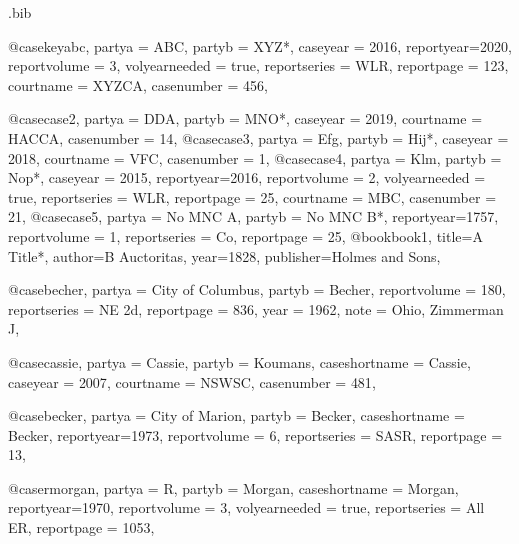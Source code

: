 

\begin{filecontents*}{\jobname.bib}

@case{keyabc,
  partya = {ABC}, 
  partyb = {XYZ*},
  caseyear = {2016},
  reportyear={2020},
  reportvolume = {3},
  volyearneeded = {true},
  reportseries = {WLR},
  reportpage = {123},
  courtname = {XYZCA},
  casenumber = {456},
	}

@case{case2,
  partya = {DDA}, 
  partyb = {MNO*},
  caseyear = {2019},
  courtname = {HACCA},
  casenumber = {14},
	}
@case{case3,
  partya = {Efg}, 
  partyb = {Hij*},
  caseyear = {2018},
  courtname = {VFC},
  casenumber = {1},
	}
@case{case4,
  partya = {Klm}, 
  partyb = {Nop*},
  caseyear = {2015},
  reportyear={2016},
  reportvolume = {2},
  volyearneeded = {true},
  reportseries = {WLR},
  reportpage = {25},
  courtname = {MBC},
  casenumber = {21},
	}
@case{case5,
  partya = {No MNC A}, 
  partyb = {No MNC B*},
  reportyear={1757},
  reportvolume = {1},
  reportseries = {Co},
  reportpage = {25},
	}
@book{book1,
	title={A Title*},
	author={B Auctoritas},
	year={1828},
	publisher={Holmes and Sons},
	}



@case{becher,
  partya = {City of Columbus}, 
  partyb = {Becher},
  reportvolume = {180},
  reportseries = {NE 2d},
  reportpage = {836},
  year = {1962},
  note = {Ohio, Zimmerman J},
	}


@case{cassie,
  partya = {Cassie}, 
  partyb = {Koumans},
  caseshortname = {Cassie},
  caseyear = {2007},
  courtname = {NSWSC},
  casenumber = {481},
	}


@case{becker,
  partya = {City of Marion}, 
  partyb = {Becker},
  caseshortname = {Becker},
  reportyear={1973},
  reportvolume = {6},
  reportseries = {SASR},
  reportpage = {13},
	}

@case{rmorgan,
  partya = {R}, 
  partyb = {Morgan},
  caseshortname = {Morgan},
  reportyear={1970},
  reportvolume = {3},
  volyearneeded = {true},
  reportseries = {All ER},
  reportpage = {1053},
	}



\end{filecontents*}
